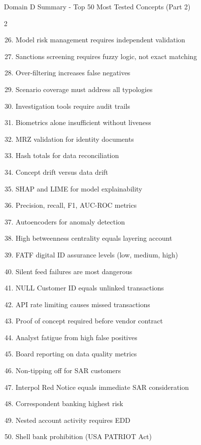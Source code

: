 \documentclass[11pt,a4paper]{beamer}
\begin{document}
	\begin{frame}{Domain D Summary - Top 50 Most Tested Concepts (Part 2)}
		\begin{multicols}{2}
			\begin{enumerate}
				\setcounter{enumi}{25}
				\item Model risk management requires independent validation
				\item Sanctions screening requires fuzzy logic, not exact matching
				\item Over-filtering increases false negatives
				\item Scenario coverage must address all typologies
				\item Investigation tools require audit trails
				\item Biometrics alone insufficient without liveness
				\item MRZ validation for identity documents
				\item Hash totals for data reconciliation
				\item Concept drift versus data drift
				\item SHAP and LIME for model explainability
				\item Precision, recall, F1, AUC-ROC metrics
				\item Autoencoders for anomaly detection
				\item High betweenness centrality equals layering account
				\item FATF digital ID assurance levels (low, medium, high)
				\item Silent feed failures are most dangerous
				\item NULL Customer ID equals unlinked transactions
				\item API rate limiting causes missed transactions
				\item Proof of concept required before vendor contract
				\item Analyst fatigue from high false positives
				\item Board reporting on data quality metrics
				\item Non-tipping off for SAR customers
				\item Interpol Red Notice equals immediate SAR consideration
				\item Correspondent banking highest risk
				\item Nested account activity requires EDD
				\item Shell bank prohibition (USA PATRIOT Act)
			\end{enumerate}
		\end{multicols}
	\end{frame}
	
\end{document}

